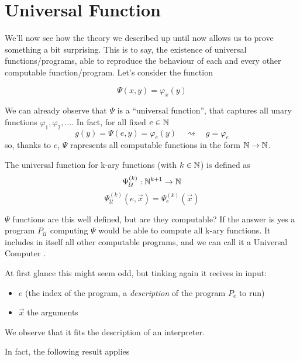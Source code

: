 \chapter {Universal Function}
\newcommand{\Psiex}{\ensuremath{\Psi_{\mathcal{U}}^{(k)} (e, \vec{x})}}
\newcommand{\Psiuex}{\ensuremath{\Psi_e^{(k)} (\vec{x})}}
\newcommand{\univ}{\ensuremath{\Psi_{\mathcal{U}}}}
We'll now see how the theory we described up until now allows us to
prove something a bit surprising. This is to say, the existence of
universal functions/programs, able to reproduce the behaviour of each
and every other computable function/program. Let's consider the function

\[
  \Psi(x,y) = \varphi_x(y)
\]

We can already observe that $\Psi$ is a ``universal function'', that
captures all unary functions $\varphi_1, \varphi_2, \dots$. In fact,
for all fixed $e \in \mathbb{N}$
\[
  g(y) = \Psi(e,y) = \varphi_e(y) \quad \rightsquigarrow \quad g = \varphi_e
\]
so, thanks to $e$, $\Psi$ rapresents all computable functions in the
form $\mathbb{N} \rightarrow \mathbb{N}$.

\begin{definition}
  The universal function for k-ary functions (with $k \in \mathbb{N}$) is
  defined as
  \[
    \univ^{(k)} : \nat^{k+1} \rightarrow \nat
  \]
  \[
    \Psiex = \Psiuex
  \]
\end{definition}
$\Psi$ functions are this well defined, but are they computable? If
the answer is yes a program $P_{\mathcal{U}}$ computing $\Psi$ would
be able to compute all k-ary functions. It includes in itself all
other computable programs, and we can call it a Universal Computer
\cite{davis:2011}.

At first glance this might seem odd, but tinking again it recives in
input:
\begin{itemize}
\item $e$ (the index of the program, a \textit{description} of the
  program $P_e$ to run)
\item $\vec{x}$ the arguments
\end{itemize}
We observe that it fits the description of an interpreter.

In fact, the following result applies

